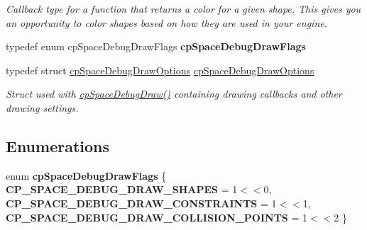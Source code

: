 \begin{DoxyCompactItemize}
\begin{DoxyCompactList}\small\item\em Callback type for a function that returns a color for a given shape. This gives you an opportunity to color shapes based on how they are used in your engine. \end{DoxyCompactList}\item 
\hypertarget{group__cp_space_gaa625807338fd5ebd8f61463dead0c32b}{}typedef enum cp\+Space\+Debug\+Draw\+Flags {\bfseries cp\+Space\+Debug\+Draw\+Flags}\label{group__cp_space_gaa625807338fd5ebd8f61463dead0c32b}

\item 
\hypertarget{group__cp_space_gabb44b3d40332bc5965e8dbd515caa71a}{}typedef struct \hyperlink{structcp_space_debug_draw_options}{cp\+Space\+Debug\+Draw\+Options} \hyperlink{group__cp_space_gabb44b3d40332bc5965e8dbd515caa71a}{cp\+Space\+Debug\+Draw\+Options}\label{group__cp_space_gabb44b3d40332bc5965e8dbd515caa71a}

\begin{DoxyCompactList}\small\item\em Struct used with \hyperlink{group__cp_space_gaa1233930591cb32d25852da2cbe76680}{cp\+Space\+Debug\+Draw()} containing drawing callbacks and other drawing settings. \end{DoxyCompactList}\end{DoxyCompactItemize}
\subsection*{Enumerations}
\begin{DoxyCompactItemize}
\item 
\hypertarget{group__cp_space_ga12b09b00b23e09d770e4b2ab3980c69a}{}enum {\bfseries cp\+Space\+Debug\+Draw\+Flags} \{ {\bfseries C\+P\+\_\+\+S\+P\+A\+C\+E\+\_\+\+D\+E\+B\+U\+G\+\_\+\+D\+R\+A\+W\+\_\+\+S\+H\+A\+P\+E\+S} = 1$<$$<$0, 
{\bfseries C\+P\+\_\+\+S\+P\+A\+C\+E\+\_\+\+D\+E\+B\+U\+G\+\_\+\+D\+R\+A\+W\+\_\+\+C\+O\+N\+S\+T\+R\+A\+I\+N\+T\+S} = 1$<$$<$1, 
{\bfseries C\+P\+\_\+\+S\+P\+A\+C\+E\+\_\+\+D\+E\+B\+U\+G\+\_\+\+D\+R\+A\+W\+\_\+\+C\+O\+L\+L\+I\+S\+I\+O\+N\+\_\+\+P\+O\+I\+N\+T\+S} = 1$<$$<$2
 \}\label{group__cp_space_ga12b09b00b23e09d770e4b2ab3980c69a}

\end{DoxyCompactItemize}
